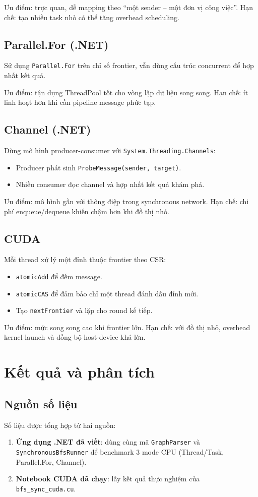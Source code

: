 \documentclass[12pt,a4paper]{article}
\begin{document}
Ưu điểm: trực quan, dễ mapping theo ``một sender -- một đơn vị công việc''.
Hạn chế: tạo nhiều task nhỏ có thể tăng overhead scheduling.

\subsection{Parallel.For (.NET)}
Sử dụng \texttt{Parallel.For} trên chỉ số frontier, vẫn dùng cấu trúc concurrent để hợp nhất kết quả.

Ưu điểm: tận dụng ThreadPool tốt cho vòng lặp dữ liệu song song.
Hạn chế: ít linh hoạt hơn khi cần pipeline message phức tạp.

\subsection{Channel (.NET)}
Dùng mô hình producer-consumer với \texttt{System.Threading.Channels}:
\begin{itemize}
    \item Producer phát sinh \texttt{ProbeMessage(sender, target)}.
    \item Nhiều consumer đọc channel và hợp nhất kết quả khám phá.
\end{itemize}

Ưu điểm: mô hình gần với thông điệp trong synchronous network.
Hạn chế: chi phí enqueue/dequeue khiến chậm hơn khi đồ thị nhỏ.

\subsection{CUDA}
Mỗi thread xử lý một đỉnh thuộc frontier theo CSR:
\begin{itemize}
    \item \texttt{atomicAdd} để đếm message.
    \item \texttt{atomicCAS} để đảm bảo chỉ một thread đánh dấu đỉnh mới.
    \item Tạo \texttt{nextFrontier} và lặp cho round kế tiếp.
\end{itemize}

Ưu điểm: mức song song cao khi frontier lớn.
Hạn chế: với đồ thị nhỏ, overhead kernel launch và đồng bộ host-device khá lớn.

\section{Kết quả và phân tích}

\subsection{Nguồn số liệu}
Số liệu được tổng hợp từ hai nguồn:
\begin{enumerate}
    \item \textbf{Ứng dụng .NET đã viết}: dùng cùng mã \texttt{GraphParser} và \texttt{SynchronousBfsRunner}
    để benchmark 3 mode CPU (Thread/Task, Parallel.For, Channel).
    \item \textbf{Notebook CUDA đã chạy}: lấy kết quả thực nghiệm của \texttt{bfs\_sync\_cuda.cu}.
\end{enumerate}
\end{document}
